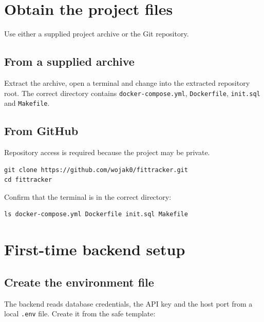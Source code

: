 \documentclass[11pt,a4paper]{article}
\begin{document}
\section{Obtain the project files}

Use either a supplied project archive or the Git repository.

\subsection{From a supplied archive}

Extract the archive, open a terminal and change into the extracted repository
root. The correct directory contains \texttt{docker-compose.yml},
\texttt{Dockerfile}, \texttt{init.sql} and \texttt{Makefile}.

\subsection{From GitHub}

Repository access is required because the project may be private.

\begin{lstlisting}[caption={Cloning the repository}]
git clone https://github.com/wojak0/fittracker.git
cd fittracker
\end{lstlisting}

Confirm that the terminal is in the correct directory:

\begin{lstlisting}[caption={Checking the repository root}]
ls docker-compose.yml Dockerfile init.sql Makefile
\end{lstlisting}

\section{First-time backend setup}

\subsection{Create the environment file}

The backend reads database credentials, the API key and the host port from a
local \texttt{.env} file. Create it from the safe template:
\end{document}
